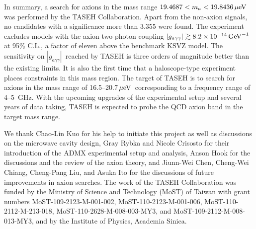 \documentclass[%
 reprint,prl, %
superscriptaddress,
nobibnotes,
 amsmath,amssymb,
 aps,
]{revtex4-2}
\newcommand{\gagg}{\ensuremath{\left|g_{a\gamma\gamma}\right|}}
\newcommand{\ma}{\ensuremath{m_a}}
\newcommand{\muevcc}{\ensuremath{\,\mu\text{e\hspace{-.08em}V}}}
\newcommand{\GeVinv}{\ensuremath{\,\text{Ge\hspace{-.08em}V}^{-1}}}
\newcommand{\mlo}{\ensuremath{19.4687}}
\newcommand{\mhi}{\ensuremath{19.8436}}
\newcommand{\avelimit}{\ensuremath{8.2\times 10^{-14}}} %
\begin{document}
In summary, a search for axions in the mass 
range $\mlo < \ma < \mhi \muevcc$ was performed by the TASEH Collaboration.  
Apart from the non-axion signals, no candidates with a significance more than
3.355 were found. The experiment excludes models with the 
axion-two-photon coupling $\gagg\gtrsim \avelimit\GeVinv$ at 95\% C.L.,
 a factor of eleven 
above the benchmark KSVZ model. The sensitivity on \gagg\ reached by TASEH 
is three orders of magnitude better than the existing limits. 
It is also the first time that a haloscope-type experiment places 
constraints in this mass region. 
The target of TASEH is to search for axions in the mass range of 
16.5--20.7\muevcc\ corresponding to a frequency range of 4--5~GHz. 
With the upcoming upgrades of the experimental setup and several years of data 
taking, TASEH is expected to probe the QCD axion band in the target mass range.

\begin{acknowledgments}
We thank Chao-Lin Kuo for his help to initiate this project as well as
discussions on the microwave cavity design, Gray Rybka and Nicole Crisosto
for their introduction of the ADMX experimental
setup and analysis, Anson Hook for the discussions and the review of the
axion theory, and Jiunn-Wei Chen, Cheng-Wei Chiang, Cheng-Pang Liu, and
Asuka Ito for the discussions of future improvements in axion searches.
  The work of the TASEH Collaboration was funded by
the Ministry of Science and Technology (MoST) of Taiwan with grant numbers
MoST-109-2123-M-001-002, MoST-110-2123-M-001-006, MoST-110-2112-M-213-018,
MoST-110-2628-M-008-003-MY3,
and MoST-109-2112-M-008-013-MY3, and by the Institute of Physics, Academia
Sinica.
\end{acknowledgments}

\end{document}
